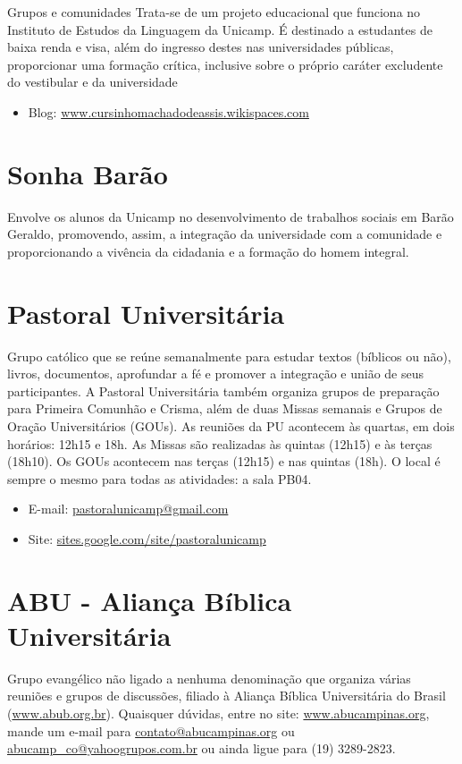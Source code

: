 \begin{story}{Grupos e comunidades}
Trata-se de um projeto educacional que funciona no Instituto de Estudos da Linguagem da Unicamp. É destinado a estudantes de baixa renda e visa, além do ingresso destes nas universidades públicas, proporcionar uma formação crítica, inclusive sobre o próprio caráter excludente do vestibular e da universidade

\begin{itemize}
\item Blog: \url{www.cursinhomachadodeassis.wikispaces.com}
\end{itemize}

\section*{Sonha Barão}

Envolve os alunos da Unicamp no desenvolvimento de trabalhos sociais em Barão Geraldo, promovendo, assim, a integração da universidade com a comunidade e proporcionando a vivência da cidadania e a formação do homem integral.

\section*{Pastoral Universitária}

Grupo católico que se reúne semanalmente para estudar textos (bíblicos ou não), livros, documentos, aprofundar a fé e promover a integração e união de seus participantes. A Pastoral Universitária também organiza grupos de preparação para Primeira Comunhão e Crisma, além de duas Missas semanais e Grupos de Oração Universitários (GOUs). As reuniões da PU acontecem às quartas, em dois horários: 12h15 e 18h. As Missas são realizadas às quintas (12h15) e às terças (18h10). Os GOUs acontecem nas terças (12h15) e nas quintas (18h). O local é sempre o mesmo para todas as atividades: a sala PB04.

\begin{itemize}
\item E-mail: \url{pastoralunicamp@gmail.com}
\item Site: \url{sites.google.com/site/pastoralunicamp}
\end{itemize}

\section*{ABU - Aliança Bíblica Universitária}

Grupo evangélico não ligado a nenhuma denominação que organiza várias reuniões e grupos de discussões, filiado à Aliança Bíblica Universitária do Brasil (\url{www.abub.org.br}). Quaisquer dúvidas, entre no site: \url{www.abucampinas.org}, mande um e-mail para \url{contato@abucampinas.org} ou \url{abucamp_co@yahoogrupos.com.br} ou ainda ligue para (19) 3289-2823.

\end{story}

